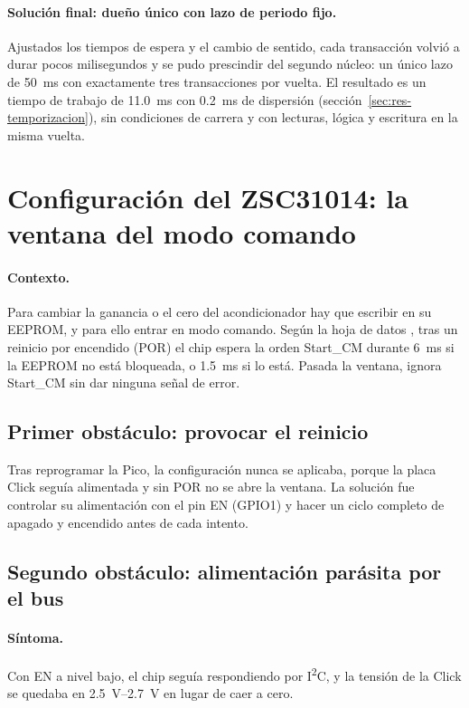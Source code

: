 \paragraph{Solución final: dueño único con lazo de periodo fijo.} Ajustados los tiempos de espera y
el cambio de sentido, cada transacción volvió a durar pocos milisegundos y se pudo prescindir del
segundo núcleo: un único lazo de \SI{50}{\milli\second} con exactamente tres transacciones por
vuelta. El resultado es un tiempo de trabajo de \SI{11.0}{\milli\second} con \SI{0.2}{\milli\second}
de dispersión (sección~\ref{sec:res-temporizacion}), sin condiciones de carrera y con lecturas,
lógica y escritura en la misma vuelta.

\section{Configuración del ZSC31014: la ventana del modo comando}
\label{sec:prob-zsc}

\paragraph{Contexto.} Para cambiar la ganancia o el cero del acondicionador hay que escribir en su
EEPROM, y para ello entrar en modo comando. Según la hoja de datos \cite{zsc31014}, tras un reinicio
por encendido (POR) el chip espera la orden Start\_CM durante \SI{6}{\milli\second} si la EEPROM no
está bloqueada, o \SI{1.5}{\milli\second} si lo está. Pasada la ventana, ignora Start\_CM sin dar
ninguna señal de error.

\subsection{Primer obstáculo: provocar el reinicio}

Tras reprogramar la Pico, la configuración nunca se aplicaba, porque la placa Click seguía
alimentada y sin POR no se abre la ventana. La solución fue controlar su alimentación con el pin EN
(GPIO1) y hacer un ciclo completo de apagado y encendido antes de cada intento.

\subsection{Segundo obstáculo: alimentación parásita por el bus}

\paragraph{Síntoma.} Con EN a nivel bajo, el chip seguía respondiendo por I\textsuperscript{2}C, y la
tensión de la Click se quedaba en \SIrange{2.5}{2.7}{\volt} en lugar de caer a cero.

